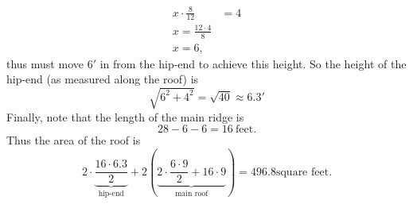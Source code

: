 \documentclass[hints,nooutcomes,noauthor,handout]{ximera}
\begin{document}
\begin{question}
\begin{freeResponse}
\begin{enumerate}
      \begin{align*}
        x\cdot \frac{8}{12} &= 4\\
        x = \frac{12\cdot 4}{8}\\
        x = 6,
      \end{align*}
      thus must move $6'$ in from the hip-end to achieve this height.
      So the height of the hip-end (as measured along the roof) is
      \[
      \sqrt{6^2+4^2} = \sqrt{40} \approx 6.3'
      \]
      Finally, note that the length of the main ridge is
      \[
      28-6-6 = 16~\text{feet}.
      \]
      Thus the area of the roof is
      \[
      2\cdot \underbrace{\frac{16\cdot 6.3}{2}}_{\text{hip-end}} +
      2\left(\underbrace{2\cdot \frac{6\cdot 9}{2} + 16\cdot
        9}_{\text{main roof}}\right) = 496.8 \text{square feet}.
      \]
  \end{enumerate}
\end{freeResponse}


\end{question}
\mynewpage
\end{document}
